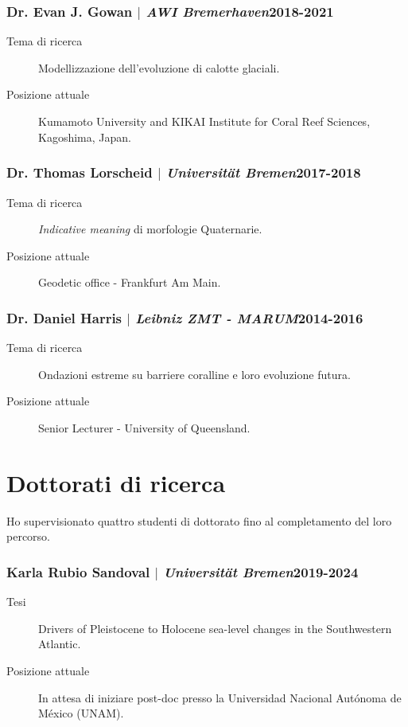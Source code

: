 \documentclass[11pt]{article}
\begin{document}
\smallskip
\subsubsection{Dr. Evan J. Gowan $|$ {\normalfont\textit{AWI Bremerhaven}}\hfill 2018-2021}
{\footnotesize 
\begin{description}
  \item [Tema di ricerca] Modellizzazione dell'evoluzione di calotte glaciali. 
  \item [Posizione attuale] Kumamoto University and KIKAI Institute for Coral Reef Sciences, Kagoshima, Japan. 
\end{description}
}
\smallskip
\subsubsection{Dr. Thomas Lorscheid $|$ {\normalfont\textit{Universität Bremen}}\hfill 2017-2018}
{\footnotesize 
\begin{description}
  \item [Tema di ricerca] \textit{Indicative meaning} di morfologie Quaternarie. 
  \item [Posizione attuale] Geodetic office - Frankfurt Am Main. 
\end{description}
}

\smallskip
\subsubsection{Dr. Daniel Harris $|$ {\normalfont\textit{Leibniz ZMT - MARUM}}\hfill 2014-2016}
{\footnotesize 
\begin{description}
  \item [Tema di ricerca] Ondazioni estreme su barriere coralline e loro evoluzione futura. 
  \item [Posizione attuale] Senior Lecturer - University of Queensland. 
\end{description}
}
\newpage

\section{Dottorati di ricerca}
{\normalfont Ho supervisionato quattro studenti di dottorato fino al completamento del loro percorso.}\\

\subsubsection{Karla Rubio Sandoval $|$ {\normalfont\textit{Universität Bremen}}\hfill 2019-2024}
{\footnotesize 
\begin{description}
  \item [Tesi] Drivers of Pleistocene to Holocene sea-level changes in the Southwestern Atlantic.
  \item [Posizione attuale] In attesa di iniziare post-doc presso la Universidad Nacional Autónoma de México (UNAM). 
\end{description}
}
\smallskip
\end{document}
